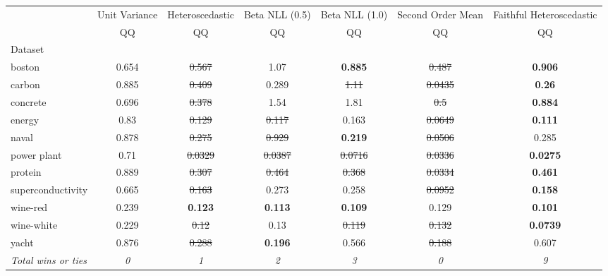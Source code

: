 \begin{tabular}{l|c|c|c|c|c|c}
\toprule
{} & {Unit Variance} & {Heteroscedastic} & {Beta NLL (0.5)} & {Beta NLL (1.0)} & {Second Order Mean} & {Faithful Heteroscedastic} \\
{} & {QQ} & {QQ} & {QQ} & {QQ} & {QQ} & {QQ} \\
{Dataset} & {} & {} & {} & {} & {} & {} \\
\midrule
boston & 0.654 & \sout{0.567} & 1.07 & \textbf{0.885} & \sout{0.487} & \textbf{0.906} \\
carbon & 0.885 & \sout{0.409} & 0.289 & \sout{1.11} & \sout{0.0435} & \textbf{0.26} \\
concrete & 0.696 & \sout{0.378} & 1.54 & 1.81 & \sout{0.5} & \textbf{0.884} \\
energy & 0.83 & \sout{0.129} & \sout{0.117} & 0.163 & \sout{0.0649} & \textbf{0.111} \\
naval & 0.878 & \sout{0.275} & \sout{0.929} & \textbf{0.219} & \sout{0.0506} & 0.285 \\
power plant & 0.71 & \sout{0.0329} & \sout{0.0387} & \sout{0.0716} & \sout{0.0336} & \textbf{0.0275} \\
protein & 0.889 & \sout{0.307} & \sout{0.464} & \sout{0.368} & \sout{0.0334} & \textbf{0.461} \\
superconductivity & 0.665 & \sout{0.163} & 0.273 & 0.258 & \sout{0.0952} & \textbf{0.158} \\
wine-red & 0.239 & \textbf{0.123} & \textbf{0.113} & \textbf{0.109} & 0.129 & \textbf{0.101} \\
wine-white & 0.229 & \sout{0.12} & 0.13 & \sout{0.119} & \sout{0.132} & \textbf{0.0739} \\
yacht & 0.876 & \sout{0.288} & \textbf{0.196} & 0.566 & \sout{0.188} & 0.607 \\
\textit{{Total wins or ties}} & \textit{0} & \textit{1} & \textit{2} & \textit{3} & \textit{0} & \textit{9} \\
\bottomrule
\end{tabular}
